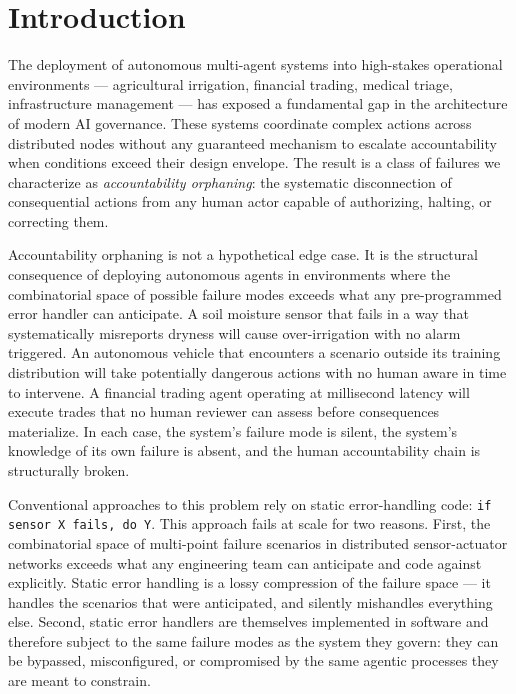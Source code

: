 \section{Introduction}
\label{sec:introduction}

The deployment of autonomous multi-agent systems into high-stakes operational environments — agricultural irrigation, financial trading, medical triage, infrastructure management — has exposed a fundamental gap in the architecture of modern AI governance. These systems coordinate complex actions across distributed nodes without any guaranteed mechanism to escalate accountability when conditions exceed their design envelope. The result is a class of failures we characterize as \textit{accountability orphaning}: the systematic disconnection of consequential actions from any human actor capable of authorizing, halting, or correcting them.

Accountability orphaning is not a hypothetical edge case. It is the structural consequence of deploying autonomous agents in environments where the combinatorial space of possible failure modes exceeds what any pre-programmed error handler can anticipate. A soil moisture sensor that fails in a way that systematically misreports dryness will cause over-irrigation with no alarm triggered. An autonomous vehicle that encounters a scenario outside its training distribution will take potentially dangerous actions with no human aware in time to intervene. A financial trading agent operating at millisecond latency will execute trades that no human reviewer can assess before consequences materialize. In each case, the system's failure mode is silent, the system's knowledge of its own failure is absent, and the human accountability chain is structurally broken.

Conventional approaches to this problem rely on static error-handling code: \texttt{if sensor X fails, do Y}. This approach fails at scale for two reasons. First, the combinatorial space of multi-point failure scenarios in distributed sensor-actuator networks exceeds what any engineering team can anticipate and code against explicitly. Static error handling is a lossy compression of the failure space — it handles the scenarios that were anticipated, and silently mishandles everything else. Second, static error handlers are themselves implemented in software and therefore subject to the same failure modes as the system they govern: they can be bypassed, misconfigured, or compromised by the same agentic processes they are meant to constrain.

